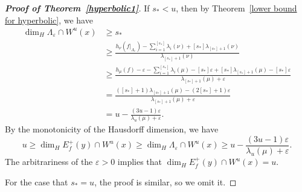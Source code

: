 \documentclass[11pt,a4paper]{amsart}
\theoremstyle{plain}
\theoremstyle{remark}
\begin{document}
\begin{proof}[\textbf{Proof of Theorem~\ref{hyperbolic1}}]
		If $s_{\ast}<u$, then by Theorem~\ref{lower bound for hyperbolic}, we have
		\begin{align*}
			\dim_{H} \Lambda_{\varepsilon}\cap W^{u}(x)&\geq s_{\ast}\\
			&\geq \frac{h_{\nu}(f|_{\Lambda_{\varepsilon}})-\sum_{i=1}^{[s_{\ast}]}\lambda_{i}(\nu)+[s_{\ast}]\lambda_{[s_{\ast}]+1}(\nu)}{\lambda_{[s_{\ast}]+1}(\nu)}\\
			&\geq \frac{h_{\mu}(f)-\varepsilon-\sum_{i=1}^{[s_{\ast}]}\lambda_{i}(\mu)-[s_{\ast}]\varepsilon+[s_{\ast}]\lambda_{[s_{\ast}]+1}(\mu)-[s_{\ast}]\varepsilon}{\lambda_{[s_{\ast}]+1}(\mu)+\varepsilon}\\
			&=\frac{([s_{\ast}]+1)\lambda_{[s_{\ast}]+1}(\mu)-(2[s_{\ast}]+1)\varepsilon}{\lambda_{[s_{\ast}]+1}(\mu)+\varepsilon}\\
			&=u-\frac{(3u-1)\varepsilon}{\lambda_{u}(\mu)+\varepsilon}.
		\end{align*}
		By the monotonicity of the Hausdorff dimension, we have $$u\geq \dim_{H}E^{+}_{f}(y)\cap W^{u}(x)\geq \dim_{H} \Lambda_{\varepsilon}\cap W^{u}(x)\geq u-\frac{(3u-1)\varepsilon}{\lambda_{u}(\mu)+\varepsilon}.$$ The arbitrariness of  the $\varepsilon>0$ implies that $\dim_{H}E^{+}_{f}(y)\cap W^{u}(x)=u$.
		
		For the case that $s_{\ast}=u$, the proof is similar, so we omit it.
	\end{proof}
	
	
	
\end{document}
